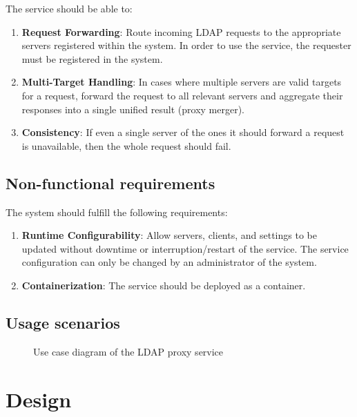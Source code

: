 \documentclass{scrartcl}
\begin{document}
\par The service should be able to:

\begin{enumerate}
    \item \textbf{Request Forwarding}: Route incoming LDAP requests to the appropriate servers registered within the system. In order to use the service, the requester must be registered in the system.
    \item \textbf{Multi-Target Handling}: In cases where multiple servers are valid targets for a request, forward the request to all relevant servers and aggregate their responses into a single unified result (proxy merger).
    \item \textbf{Consistency}: If even a single server of the ones it should forward a request is unavailable, then the whole request should fail.
\end{enumerate}

\subsection{Non-functional requirements}

\par The system should fulfill the following requirements:

\begin{enumerate}
    \item \textbf{Runtime Configurability}: Allow servers, clients, and settings to be updated without downtime or interruption/restart of the service. The service configuration can only be changed by an administrator of the system.
    \item \textbf{Containerization}: The service should be deployed as a container.
\end{enumerate}

\subsection{Usage scenarios}

\begin{figure}[h]
    \centering
    
    \caption{Use case diagram of the LDAP proxy service}
    \label{fig:usecase} 
\end{figure}

\section{Design}
\label{sec:design}
\end{document}
